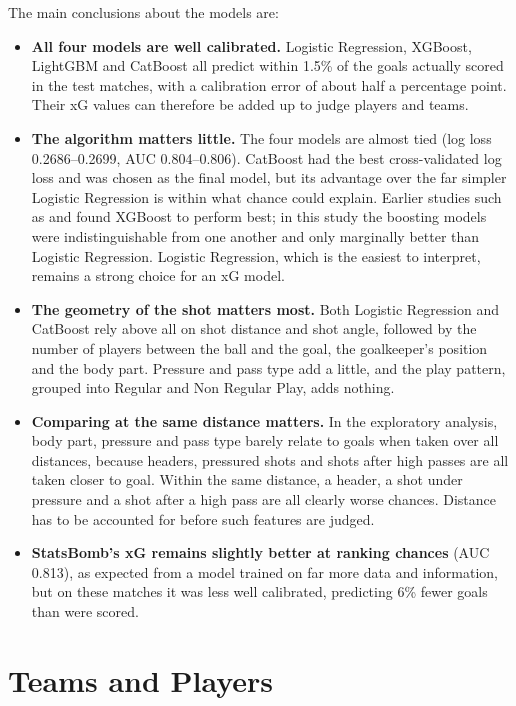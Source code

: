 The main conclusions about the models are:
\begin{itemize}
    \item \textbf{All four models are well calibrated.} Logistic Regression, XGBoost, LightGBM and CatBoost all predict within 1.5\% of the goals actually scored in the test matches, with a calibration error of about half a percentage point. Their xG values can therefore be added up to judge players and teams.
    \item \textbf{The algorithm matters little.} The four models are almost tied (log loss 0.2686--0.2699, AUC 0.804--0.806). CatBoost had the best cross-validated log loss and was chosen as the final model, but its advantage over the far simpler Logistic Regression is within what chance could explain. Earlier studies such as \cite{anzer2021goal} and \cite{madrero2020creating} found XGBoost to perform best; in this study the boosting models were indistinguishable from one another and only marginally better than Logistic Regression. Logistic Regression, which is the easiest to interpret, remains a strong choice for an xG model.
    \item \textbf{The geometry of the shot matters most.} Both Logistic Regression and CatBoost rely above all on shot distance and shot angle, followed by the number of players between the ball and the goal, the goalkeeper's position and the body part. Pressure and pass type add a little, and the play pattern, grouped into Regular and Non Regular Play, adds nothing.
    \item \textbf{Comparing at the same distance matters.} In the exploratory analysis, body part, pressure and pass type barely relate to goals when taken over all distances, because headers, pressured shots and shots after high passes are all taken closer to goal. Within the same distance, a header, a shot under pressure and a shot after a high pass are all clearly worse chances. Distance has to be accounted for before such features are judged.
    \item \textbf{StatsBomb's xG remains slightly better at ranking chances} (AUC 0.813), as expected from a model trained on far more data and information, but on these matches it was less well calibrated, predicting 6\% fewer goals than were scored.
\end{itemize}

\section{Teams and Players}

